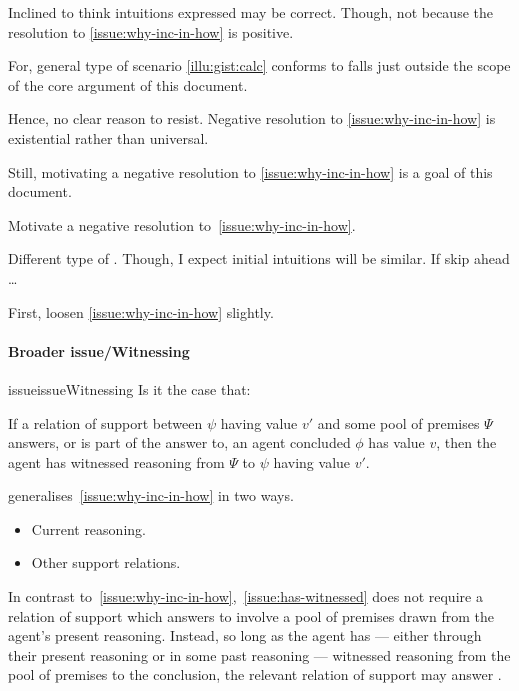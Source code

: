 \begin{note}
  Inclined to think intuitions expressed may be correct.
  Though, not because the resolution to \autoref{issue:why-inc-in-how} is positive.

  For, general type of scenario \autoref{illu:gist:calc} conforms to falls just outside the scope of the core argument of this document.

  Hence, no clear reason to resist.
  Negative resolution to \autoref{issue:why-inc-in-how} is existential rather than universal.
\end{note}

\begin{note}
  Still, motivating a negative resolution to \autoref{issue:why-inc-in-how} is a goal of this document.

  \begin{goal}
    Motivate a negative resolution to~\autoref{issue:why-inc-in-how}.
  \end{goal}

  Different type of .
  Though, I expect initial intuitions will be similar.
  If skip ahead \dots

  First, loosen \autoref{issue:why-inc-in-how} slightly.
\end{note}

\paragraph*{Broader issue/Witnessing}

\begin{note}
  \begin{restatable}[Witnessing]{issue}{issueWitnessing}
    \label{issue:has-witnessed}
    Is it the case that:

    If a relation of support between \(\psi\) having value \(v'\) and some pool of premises \(\Psi\) answers, or is part of the answer to, \qWhy{} an agent concluded \(\phi\) has value \(v\), then the agent has witnessed reasoning from \(\Psi\) to \(\psi\) having value \(v'\).
  \end{restatable}

  {
    \color{red}
     generalises~\autoref{issue:why-inc-in-how} in two ways.
    \begin{itemize}
    \item
      Current reasoning.
    \item
      Other support relations.
    \end{itemize}
  }

  In contrast to~\autoref{issue:why-inc-in-how},~\autoref{issue:has-witnessed} does not require a relation of support which answers \qWhy{} to involve a pool of premises drawn from the agent's present reasoning.
  Instead, so long as the agent has --- either through their present reasoning or in some past reasoning --- witnessed reasoning from the pool of premises to the conclusion, the relevant relation of support may answer \qWhy{}.
\end{note}

